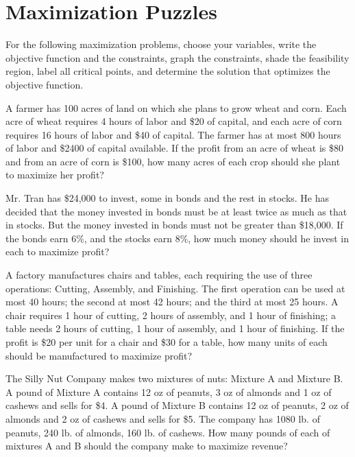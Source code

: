 \section{Maximization Puzzles}

For the following maximization problems, choose your variables, write the objective function and the constraints, graph the constraints, shade the feasibility region, label all critical points, and determine the solution that optimizes the objective function.

\begin{puzzle}
    A farmer has 100 acres of land on which she plans to grow wheat and corn. Each acre of wheat
    requires 4 hours of labor and \$20 of capital, and each acre of corn requires 16 hours of labor and
    \$40 of capital. The farmer has at most 800 hours of labor and \$2400 of capital available. If the
    profit from an acre of wheat is \$80 and from an acre of corn is \$100, how many acres of each crop
    should she plant to maximize her profit?
\end{puzzle}

\begin{puzzle}
    Mr. Tran has \$24,000 to invest, some in bonds and the rest in stocks. He has decided that the
    money invested in bonds must be at least twice as much as that in stocks. But the money invested
    in bonds must not be greater than \$18,000. If the bonds earn 6\%, and the stocks earn 8\%, how
    much money should he invest in each to maximize profit?
\end{puzzle}

\begin{puzzle}
    A factory manufactures chairs and tables, each requiring the use of three operations: Cutting,
    Assembly, and Finishing. The first operation can be used at most 40 hours; the second at most 42
    hours; and the third at most 25 hours. A chair requires 1 hour of cutting, 2 hours of assembly, and
    1 hour of finishing; a table needs 2 hours of cutting, 1 hour of assembly, and 1 hour of finishing.
    If the profit is \$20 per unit for a chair and \$30 for a table, how many units of each should be
    manufactured to maximize profit?

\end{puzzle}

\begin{puzzle}
    The Silly Nut Company makes two mixtures of nuts: Mixture A and Mixture B. A pound of
    Mixture A contains 12 oz of peanuts, 3 oz of almonds and 1 oz of cashews and sells for \$4. A pound
    of Mixture B contains 12 oz of peanuts, 2 oz of almonds and 2 oz of cashews and sells for \$5. The
    company has 1080 lb. of peanuts, 240 lb. of almonds, 160 lb. of cashews. How many pounds of
    each of mixtures A and B should the company make to maximize revenue?
\end{puzzle}